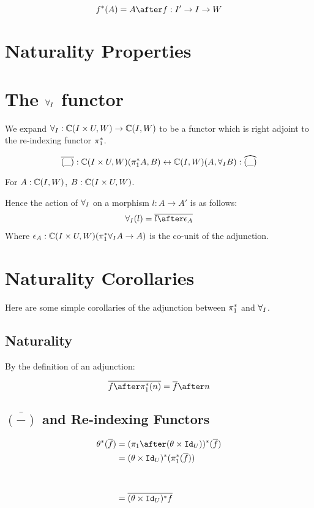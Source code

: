 \documentclass{report}
\begin{document}
\begin{equation}
    f\star(A) = A\after f: I'\rightarrow I\rightarrow W
\end{equation}

\section{Naturality Properties}

\section{The $\forall_I$ functor}
We expand $\forall_I: \mathbb{C}(I\times U, W) \rightarrow \mathbb{C}(I, W)$ to be a functor which is right adjoint to the re-indexing functor $\pi_1^*$.

\begin{equation}
    \bar{(\_)}: \ciuw(\pstar A, B) \leftrightarrow \ciw(A, \allI B) : \widehat{(\_)}
\end{equation}

For $A: \mathbb{C}(I, W)$, $B: \mathbb{C}(I\times U, W)$.

Hence the action of $\forall_I$ on a morphism $l : A\rightarrow A'$ is as follows:
\begin{eqnarray}
    \allI(l) = \bar{l\after\e_A}
\end{eqnarray}
Where $\epsilon_A: \mathbb{C}(I\times U, W)(\pi_1^*\forall_I A \rightarrow A)$ is the co-unit of the adjunction.

\section{Naturality Corollaries}
Here are some simple corollaries of the adjunction between $\pi_1^*$ and $\forall_I$.

\subsection{Naturality}
By the definition of an adjunction:

\begin{equation}
    \bar{f\after\pstar(n)} = \bar{f}\after n
\end{equation}

\subsection{$\bar{(-)}$ and Re-indexing Functors}

\begin{align}
    \theta\star(\bar{f}) & = (\p\after(\theta\times\Id{U}))\star(\bar{f})\\\
     &= (\theta\times\Id{U})\star(\p\star(\bar{f}))\\
     \\
     \\
     &= \bar{(\theta\times\Id{U})\star f}\\
     \\
\end{align}
\end{document}
